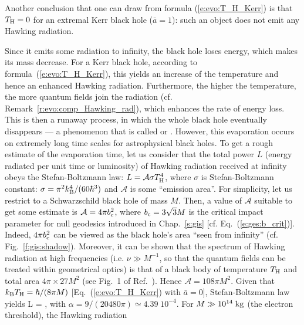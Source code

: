 Another conclusion that one can draw from formula (\ref{e:evo:T_H_Kerr}) is
that $T_{\rm H}=0$ for an extremal Kerr black hole ($\bar{a}=1$): such an object does not emit any Hawking radiation.

Since it emits some radiation to infinity, the black hole loses energy, which
makes its mass decrease. For a Kerr black hole, according to formula~(\ref{e:evo:T_H_Kerr}),
this yields an increase
of the temperature and hence an enhanced Hawking radiation. Furthermore,
the higher the temperature,
the more quantum fields join the radiation
(cf. Remark~\ref{r:evo:comp_Hawking_rad}), which enhances
the rate of energy loss. This is then a runaway process, in which the whole
black hole eventually disappears --- a phenomenon that is called
or .
However, this evaporation occurs on extremely long time scales for astrophysical black holes.
To get a rough estimate of the evaporation time, let us consider
that the total power $L$
(energy radiated per unit time or luminosity) of Hawking radiation received at infinity
obeys the Stefan-Boltzmann law:
$L = \mathcal{A} \sigma T_{\rm H}^4$, where $\sigma$ is Stefan-Boltzmann constant:
$\sigma = \pi^2 k_{\rm B}^4/(60 \hbar^3)$ and $\mathcal{A}$ is some ``emission area''.
For simplicity, let us restrict to a Schwarzschild black hole of mass $M$. Then, a value
of $\mathcal{A}$ suitable to get some estimate is
$\mathcal{A} = 4\pi b_{\rm c}^2$, where
$b_{\rm c} = 3\sqrt{3} M$ is the critical impact parameter for null geodesics
introduced in Chap.~\ref{s:gis} [cf. Eq.~(\ref{e:ges:b_crit})]. Indeed, $4 \pi b_{\rm c}^2$
can be viewed as the black hole's area ``seen from infinity'' (cf. Fig.~\ref{f:gis:shadow}).
Moreover, it can be shown that the spectrum of Hawking radiation at high frequencies (i.e. $\nu \gg M^{-1}$, so that the quantum fields can be treated within geometrical optics) is that of a black
body of temperature $T_{\rm H}$ and total area $4\pi \times 27 M^2$ (see Fig.~1 of Ref.~\cite{Page76}). Hence
$\mathcal{A} = 108\pi M^2$. Given that
$k_{\rm B} T_{\rm H} = \hbar/(8\pi M)$ [Eq.~(\ref{e:evo:T_H_Kerr}) with $\bar{a}=0$],
Stefan-Boltzmann law yields
\be \label{e:evo:Hawking_rad_power}
    L = \alpha {} ,
\ee
with $\alpha = 9 / (20480\pi) \simeq 4.39\; 10^{-4}$.
For $M \gg 10^{14} {\rm\; kg}$ (the electron threshold), the Hawking radiation
